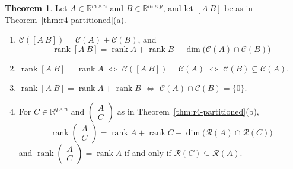 \documentclass[12pt]{article}
\newcommand{\R}{\mathbb R}
\DeclareMathOperator{\rank}{rank}
\theoremstyle{definition}
\newtheorem{theorem}{Theorem}
\begin{document}
\begin{theorem}\label{thm:r4-rank-concat}
Let \(A\in\R^{m\times n}\) and \(B\in\R^{m\times p}\), and let \([A\ B]\) be as in
Theorem~\ref{thm:r4-partitioned}(a).
\begin{enumerate}
\item \(\mathcal C([A\ B])=\mathcal C(A)+\mathcal C(B)\), and
\[
\rank[A\ B]=\rank A+\rank B-\dim\bigl(\mathcal C(A)\cap\mathcal C(B)\bigr)
\]
\item \(\rank[A\ B]=\rank A\) \(\Leftrightarrow\) \(\mathcal C([A\ B])=\mathcal C(A)\) \(\Leftrightarrow\)
\(\mathcal C(B)\subseteq\mathcal C(A)\).
\item \(\rank[A\ B]=\rank A+\rank B\) \(\Leftrightarrow\) \(\mathcal C(A)\cap\mathcal C(B)=\{0\}\).
\item For \(C\in\R^{q\times n}\) and \(\left(\begin{smallmatrix}A\\C\end{smallmatrix}\right)\) as in
Theorem~\ref{thm:r4-partitioned}(b),
\[
\rank\begin{pmatrix}A\\C\end{pmatrix}=\rank A+\rank C-\dim\bigl(\mathcal R(A)\cap\mathcal R(C)\bigr)
\]
and \(\rank\left(\begin{smallmatrix}A\\C\end{smallmatrix}\right)=\rank A\) if and only if
\(\mathcal R(C)\subseteq\mathcal R(A)\).
\end{enumerate}
\end{theorem}
\end{document}
